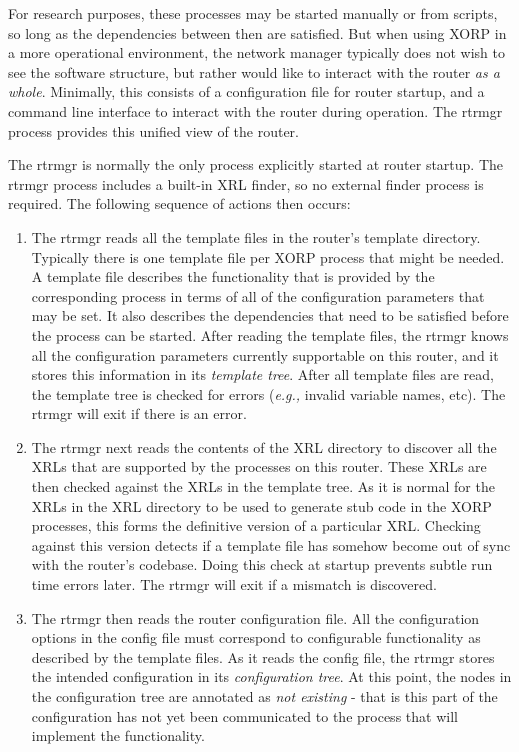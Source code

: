\documentclass[11pt]{article}
\newcommand{\eg}{\emph{e.g.,}\xspace}
\begin{document}
For research purposes, these processes may be started manually or from
scripts, so long as the dependencies between then are satisfied.  But
when using XORP in a more operational environment, the network manager
typically does not wish to see the software structure, but rather
would like to interact with the router {\it as a whole}.  Minimally, this
consists of a configuration file for router startup, and a command
line interface to interact with the router during operation.  The
rtrmgr process provides this unified view of the router.

The rtrmgr is normally the only process explicitly started at router
startup.  The rtrmgr process includes a built-in XRL finder, so no
external finder process is required.  The following sequence of
actions then occurs:

\begin{enumerate}

  \item The rtrmgr reads all the template files in the router's template
  directory.  Typically there is one template file per XORP process that
  might be needed.  A template file describes the functionality that is
  provided by the corresponding process in terms of all of the
  configuration parameters that may be set.  It also describes the
  dependencies that need to be satisfied before the process can be
  started.  After reading the template files, the rtrmgr knows all the
  configuration parameters currently supportable on this router, and it
  stores this information in its \textit{template tree}.
  After all template files are read, the template tree is checked for
  errors (\eg invalid variable names, etc). The rtrmgr will exit
  if there is an error.

  \item The rtrmgr next reads the contents of the XRL directory to discover
  all the XRLs that are supported by the processes on this router.
  These XRLs are then checked against the XRLs in the template tree.  As
  it is normal for the XRLs in the XRL directory to be used to generate
  stub code in the XORP processes, this forms the definitive version of
  a particular XRL.  Checking against this version detects if a template
  file has somehow become out of sync with the router's codebase.  Doing
  this check at startup prevents subtle run time errors later.  The
  rtrmgr will exit if a mismatch is discovered.

  \item The rtrmgr then reads the router configuration file.  All the
  configuration options in the config file must correspond to
  configurable functionality as described by the template files.  As it
  reads the config file, the rtrmgr stores the intended configuration in
  its \textit{configuration tree}.  At this point, the nodes in the
  configuration tree are annotated as \textit{not existing} - that is
  this part of the configuration has not yet been communicated to the
  process that will implement the functionality.


\end{enumerate}
\end{document}
